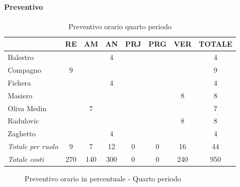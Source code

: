 \documentclass[a4paper,12pt]{article}
\begin{document}
            \paragraph{Preventivo}
                \begin{table}[H]
                \centering
                \begin{tabular}{|l|c|c|c|c|c|c|c|}
                \hline
                    \rowcolor{lightgray}{\textbf{Membro}} & {\textbf{RE}} & {\textbf{AM}} & {\textbf{AN}} & {\textbf{PRJ}} & {\textbf{PRG}} & {\textbf{VER}} & {\textbf{TOTALE}}\\
                \hline
                    Balestro & & & 4 & & & & 4\\
                \hline
                    Compagno & 9 & & & & & & 9\\
                \hline
                    Fichera & & & 4 & & & & 4\\
                \hline
                    Masiero & & & & & & 8 & 8\\
                \hline
                    Oliva Medin & & 7 & & & & & 7\\
                \hline
                    Radulovic & & & & & & 8 & 8\\
                \hline
                    Zaghetto & & & 4 & & & & 4\\
                \hline
                    \rowcolor{lightgray}\textit{Totale per ruolo} & 9 & 7 & 12 & 0 & 0 & 16 & 44\\
                \hline
                    \rowcolor{lightgray}\textit{Totale costi} & 270 & 140 & 300 & 0 & 0 & 240 & 950\\
                \hline
                \end{tabular}
                \caption{Preventivo orario quarto periodo}
                \end{table}

                \begin{figure}[H]
                \centering
                \caption{Preventivo orario in percentuale - Quarto periodo}
                \end{figure}
                
\end{document}
